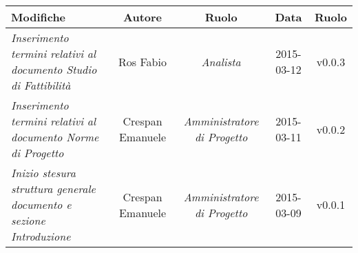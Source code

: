 \newpage

\begin{table}[h]
\centering
\begin{tabular}{|p{}|c|c|c|c|}
	\toprule
		\textbf{Modifiche} & \textbf{Autore} & \textbf{Ruolo} & \textbf{Data} & \textbf{Ruolo} \\
	\midrule
	\midrule
		\textit{Inserimento termini relativi al documento Studio di Fattibilità} & Ros Fabio & \textit{Analista} & 2015-03-12 & v0.0.3 \\
	\midrule
		\textit{Inserimento termini relativi al documento Norme di Progetto} & Crespan Emanuele & \textit{Amministratore di Progetto} & 2015-03-11 & v0.0.2 \\	                         
	\midrule
		\textit{Inizio stesura struttura generale documento e sezione Introduzione} & Crespan Emanuele & \textit{Amministratore di Progetto} & 2015-03-09 & v0.0.1 \\
	\bottomrule
\end{tabular}	
\end{table}

\newpage
